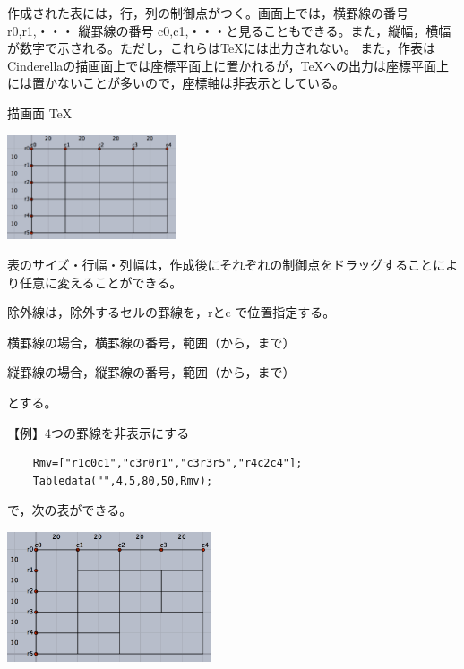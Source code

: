 \documentclass[papersize,a4paper,12pt,uplatex]{jsarticle}
\begin{document}
\begin{description}
\begin{description}
作成された表には，行，列の制御点がつく。画面上では，横罫線の番号 r0,r1,・・・  縦罫線の番号 c0,c1,・・・と見ることもできる。また，縦幅，横幅が数字で示される。ただし，これらは\TeX には出力されない。
また，作表はCinderellaの描画面上では座標平面上に置かれるが，\TeX への出力は座標平面上には置かないことが多いので，座標軸は非表示としている。

\hspace{25mm} 描画面 \hspace{45mm} TeX

\hspace{5mm}\includegraphics[bb=0 0 403.52 249.51 , width=5cm]{Fig/table01.pdf}   \hspace{10mm}   


  表のサイズ・行幅・列幅は，作成後にそれぞれの制御点をドラッグすることにより任意に変えることができる。

\vspace{\baselineskip}
除外線は，除外するセルの罫線を，rとc で位置指定する。
  
\hspace{10mm} 横罫線の場合，横罫線の番号，範囲（から，まで）

\hspace{10mm} 縦罫線の場合，縦罫線の番号，範囲（から，まで）

とする。

\vspace{\baselineskip}
【例】4つの罫線を非表示にする
\begin{verbatim}
    Rmv=["r1c0c1","c3r0r1","c3r3r5","r4c2c4"];
    Tabledata("",4,5,80,50,Rmv);
\end{verbatim}
      
で，次の表ができる。
  
\vspace{\baselineskip}
\hspace{20mm}  \includegraphics[bb=0 0 392.02 251.51 , width=6cm]{Fig/table03.pdf}


\end{description}
\end{description}
\end{document}
